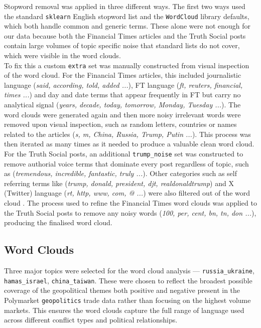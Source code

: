 \documentclass[11pt,a4paper]{article}
\begin{document}
Stopword removal was applied in three different ways. The first two ways used 
the standard \texttt{sklearn} English stopword list and the 
\texttt{WordCloud} library defaults, which both handle common and generic terms. These alone were not enough for our data
because both the Financial Times articles and the Truth Social posts contain 
large volumes of topic specific noise that standard lists do not cover, which were visible in the word clouds.\\

To fix this a custom \texttt{extra} set was manually constructed from visual inspection of the word cloud. For the Financial Times articles, this included journalistic language
(\textit{said, according, told, added ...}), FT language 
(\textit{ft, reuters, financial, times ...}) and day and date terms that appear 
frequently in FT but carry no analytical signal (\textit{years, decade, today, tomorrow, Monday, Tuesday ...}). The word clouds were generated again and then more noisy irrelevant words were removed upon visual inspection, such as random letters, countries or names related to the articles (\textit{s, m, China, Russia, Trump, Putin ...}). This process was then iterated as many times as it needed to produce a valuable clean word cloud.\\

For the Truth Social posts, an additional 
\texttt{trump\_noise} set was constructed to remove authorial voice terms 
that dominate every post regardless of topic, such as 
(\textit{tremendous, incredible, fantastic, truly ...}). Other categories such as 
self referring terms  like (\textit{trump, donald, president, djt, realdonaldtrump}) and X (Twitter) language (\textit{rt, http, www, com, @ ...}) were also filtered out of the word cloud . The process used to refine the Financial Times word clouds was applied to the Truth Social posts to remove any noisy words (\textit{100, per, cent, bn, tn, don ...}), producing the finalised word cloud.

\subsection{Word Clouds}

Three major topics were selected for the word cloud analysis --- 
\texttt{russia\_ukraine}, \texttt{hamas\_israel}, \texttt{china\_taiwan}. These were chosen to reflect 
the broadest possible coverage of the geopolitical themes both positive and negative present in the 
Polymarket \texttt{geopolitics} trade data rather than focusing on the highest volume markets. This ensures the word clouds capture the full range of language used across different conflict types and political 
relationships.\\
\end{document}

